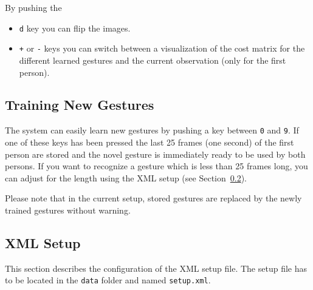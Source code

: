 \documentclass[titlepage,12pt,a4paper]{article}
\begin{document}
By pushing the 
\begin{itemize}
	\item \texttt{d} key you can flip the images.
	\item \texttt{+} or \texttt{-} keys you can switch between a visualization of the cost matrix for the different learned gestures and the current observation (only for the first person).
\end{itemize}

\subsection{Training New Gestures}

The system can easily learn new gestures by pushing a key between \texttt{0} and \texttt{9}. If one of these keys has been pressed the last 25 frames (one second) of the first person are stored and the novel gesture is immediately ready to be used by both persons. If you want to recognize a gesture which is less than 25 frames long, you can adjust for the length using the XML setup (see Section~\ref{sec:xml}).

Please note that in the current setup, stored gestures are replaced by the newly trained gestures without warning.

\subsection{XML Setup}
\label{sec:xml}
This section describes the configuration of the XML setup file. The setup file has to be located in the \texttt{data} folder and named \texttt{setup.xml}.
\end{document}
